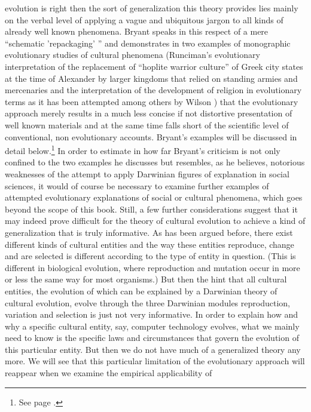 evolution is right then the sort of generalization this theory
provides lies mainly on the verbal level of applying a vague and
ubiquitous jargon to all kinds of already well known phenomena. Bryant
speaks in this respect of a mere ``schematic 'repackaging' ''
\cite[p.\ 471]{bryant:2004} and demonstrates in two examples of
monographic evolutionary studies of cultural phenomena (Runciman's
evolutionary interpretation of the replacement of ``hoplite warrior
culture'' of Greek city states at the time of Alexander by larger
kingdoms that relied on standing armies and mercenaries
\cite[]{runciman:1990} and the interpretation of the development of
religion in evolutionary terms as it has been attempted among others
by Wilson \cite[]{wilson:2002}) that the evolutionary approach merely
results in a much less concise if not distortive presentation of well
known materials and at the same time falls short of the scientific
level of conventional, non evolutionary accounts.  Bryant's examples
will be discussed in detail below.\footnote{See page
  \pageref{Bryant_examples}.} In order to estimate in how far Bryant's
criticism is not only confined to the two examples he discusses but
resembles, as he believes, notorious weaknesses of the attempt to
apply Darwinian figures of explanation in social sciences, it would of
course be necessary to examine further examples of attempted
evolutionary explanations of social or cultural phenomena, which goes
beyond the scope of this book.  Still, a few further considerations
suggest that it may indeed prove difficult for the theory of cultural
evolution to achieve a kind of generalization that is truly
informative. As has been argued before, there exist different kinds of
cultural entities and the way these entities reproduce, change and are
selected is different according to the type of entity in
question. (This is different in biological evolution, where
reproduction and mutation occur in more or less the same way for most
organisms.) But then the hint that all cultural entities, the
evolution of which can be explained by a Darwinian theory of cultural
evolution, evolve through the three Darwinian modules reproduction,
variation and selection is just not very informative. In order to
explain how and why a specific cultural entity, say, computer
technology evolves, what we mainly need to know is the specific laws
and circumstances that govern the evolution of this particular
entity. But then we do not have much of a generalized theory any
more. We will see that this particular limitation of the evolutionary
approach will reappear when we examine the empirical applicability of
